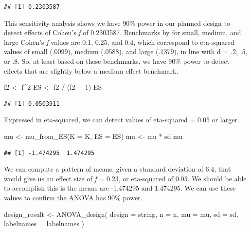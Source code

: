 \documentclass[
]{book}
\newenvironment{Shaded}{\begin{snugshade}}{\end{snugshade}}
\newcommand{\AttributeTok}[1]{\textcolor[rgb]{0.77,0.63,0.00}{#1}}
\newcommand{\DecValTok}[1]{\textcolor[rgb]{0.00,0.00,0.81}{#1}}
\newcommand{\FunctionTok}[1]{\textcolor[rgb]{0.00,0.00,0.00}{#1}}
\newcommand{\NormalTok}[1]{#1}
\newcommand{\OtherTok}[1]{\textcolor[rgb]{0.56,0.35,0.01}{#1}}
\newcommand{\SpecialCharTok}[1]{\textcolor[rgb]{0.00,0.00,0.00}{#1}}
\begin{document}
\begin{verbatim}
## [1] 0.2303587
\end{verbatim}

This sensitivity analysis shows we have 90\% power in our planned design to detect effects of Cohen's \emph{f} of 0.2303587. Benchmarks by \citet{cohen1988spa} for small, medium, and large Cohen's \emph{f} values are 0.1, 0.25, and 0.4, which correspond to eta-squared values of small (.0099), medium (.0588), and large (.1379), in line with d = .2, .5, or .8. So, at least based on these benchmarks, we have 90\% power to detect effects that are slightly below a medium effect benchmark.

\begin{Shaded}
\begin{Highlighting}[]
\NormalTok{f2 }\OtherTok{\textless{}{-}}\NormalTok{ f}\SpecialCharTok{\^{}}\DecValTok{2}
\NormalTok{ES }\OtherTok{\textless{}{-}}\NormalTok{ f2 }\SpecialCharTok{/}\NormalTok{ (f2 }\SpecialCharTok{+} \DecValTok{1}\NormalTok{)}
\NormalTok{ES}
\end{Highlighting}
\end{Shaded}

\begin{verbatim}
## [1] 0.0503911
\end{verbatim}

Expressed in eta-squared, we can detect values of eta-squared = 0.05 or larger.

\begin{Shaded}
\begin{Highlighting}[]
\NormalTok{mu }\OtherTok{\textless{}{-}} \FunctionTok{mu\_from\_ES}\NormalTok{(}\AttributeTok{K =}\NormalTok{ K, }\AttributeTok{ES =}\NormalTok{ ES)}
\NormalTok{mu }\OtherTok{\textless{}{-}}\NormalTok{ mu }\SpecialCharTok{*}\NormalTok{ sd}
\NormalTok{mu}
\end{Highlighting}
\end{Shaded}

\begin{verbatim}
## [1] -1.474295  1.474295
\end{verbatim}

We can compute a pattern of means, given a standard deviation of 6.4, that would give us an effect size of \emph{f} = 0.23, or eta-squared of 0.05. We should be able to accomplish this is the means are -1.474295 and 1.474295. We can use these values to confirm the ANOVA has 90\% power.

\begin{Shaded}
\begin{Highlighting}[]
\NormalTok{design\_result }\OtherTok{\textless{}{-}} \FunctionTok{ANOVA\_design}\NormalTok{(}
  \AttributeTok{design =}\NormalTok{ string,}
  \AttributeTok{n =}\NormalTok{ n,}
  \AttributeTok{mu =}\NormalTok{ mu,}
  \AttributeTok{sd =}\NormalTok{ sd,}
  \AttributeTok{labelnames =}\NormalTok{ labelnames}
\NormalTok{  )}
\end{Highlighting}
\end{Shaded}
\end{document}
